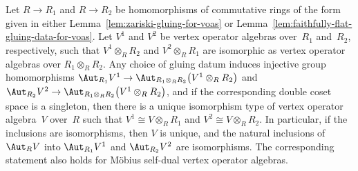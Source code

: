 \begin{lem} \label{lem:unique-voa-from-descent}Let $R \to R_1$ and $R \to R_2$ be homomorphisms of commutative rings of the form given in either Lemma~{\rm \ref{lem:zariski-gluing-for-voas}} or Lemma~{\rm \ref{lem:faithfully-flat-gluing-data-for-voas}}. Let $V^1$ and $V^2$ be vertex operator algebras over~$R_1$ and~$R_2$, respectively, such that $V^1 \otimes_{R} R_2$ and $V^2 \otimes_{R} R_1$ are isomorphic as vertex operator algebras over $R_1 \otimes_{R} R_2$. Any choice of gluing datum induces injective group homomorphisms $\Aut_{R_1} V^1 \to \Aut_{R_1 \otimes_{R} R_2} \big(V^1 \otimes_{R} R_2\big)$ and $\Aut_{R_2} V^2 \to \Aut_{R_1 \otimes_{R} R_2} \big(V^1 \otimes_{R} R_2\big)$, and if the corresponding double coset space is a singleton, then there is a unique isomorphism type of vertex operator algebra~$V$ over~$R$ such that $V^1 \cong V \otimes_{R} R_1$ and $V^2 \cong V \otimes_{R} R_2$. In particular, if the inclusions are isomorphisms, then $V$ is unique, and the natural inclusions of $\Aut_R V$ into $\Aut_{R_1} V^1$ and $\Aut_{R_2} V^2$ are isomorphisms. The corresponding statement also holds for M\"obius self-dual vertex operator algebras.
\end{lem}
